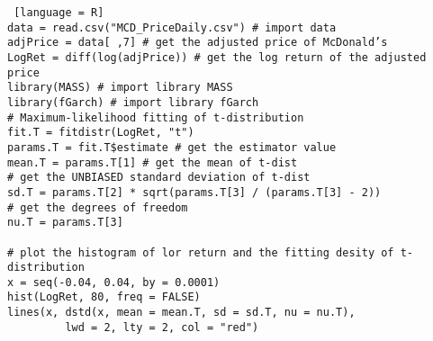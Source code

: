 \documentclass{article}
\DeclareMathOperator{\1}{\mathit{1}}
\numberwithin{figure}{section} %
\begin{document}
\begin{lstlisting} [language = R]
data = read.csv("MCD_PriceDaily.csv") # import data
adjPrice = data[ ,7] # get the adjusted price of McDonald’s
LogRet = diff(log(adjPrice)) # get the log return of the adjusted price
library(MASS) # import library MASS
library(fGarch) # import library fGarch
# Maximum-likelihood fitting of t-distribution
fit.T = fitdistr(LogRet, "t") 
params.T = fit.T$estimate # get the estimator value
mean.T = params.T[1] # get the mean of t-dist
# get the UNBIASED standard deviation of t-dist
sd.T = params.T[2] * sqrt(params.T[3] / (params.T[3] - 2)) 
# get the degrees of freedom
nu.T = params.T[3]

# plot the histogram of lor return and the fitting desity of t-distribution
x = seq(-0.04, 0.04, by = 0.0001)
hist(LogRet, 80, freq = FALSE)
lines(x, dstd(x, mean = mean.T, sd = sd.T, nu = nu.T),
         lwd = 2, lty = 2, col = "red")
\end{lstlisting}
\end{document}
